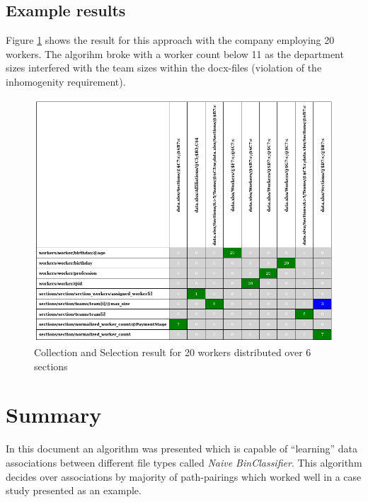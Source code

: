 \documentclass[conference]{IEEEtran}
\begin{document}
\subsection{Example results}
Figure \ref{example_table} shows the result for this approach with the company employing 20
workers. The algorihm broke with a worker count below 11 as the department sizes interfered
with the team sizes within the docx-files (violation of the inhomogenity requirement).
\begin{figure}[ht]
 \centering
 \includegraphics[scale=0.41]{img/example_table}
 \caption{Collection and Selection result for 20 workers distributed over 6 sections}
 \label{example_table}
\end{figure}

\section{Summary}
In this document an algorithm was presented which is capable of ``learning'' data associations
between different file types called \textit{Naive BinClassifier}. This algorithm decides over
associations by majority of path-pairings which worked well in a case study presented as an
example.

\printbibliography
\end{document}
